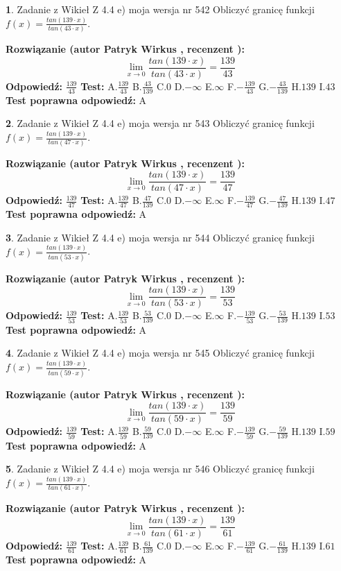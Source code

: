 \documentclass[12pt, a4paper]{article}
\theoremstyle{definition} %
\newtheorem{zad}{}
\newcommand{\zadStart}[1]{\begin{zad}#1\newline}
\newcommand{\zadStop}{\end{zad}}
\newcommand{\rozwStart}[2]{\noindent \textbf{Rozwiązanie (autor #1 , recenzent #2): }\newline}
\newcommand{\rozwStop}{\newline}
\newcommand{\odpStart}{\noindent \textbf{Odpowiedź:}\newline}
\newcommand{\odpStop}{\newline}
\newcommand{\testStart}{\noindent \textbf{Test:}\newline}
\newcommand{\testStop}{\newline}
\newcommand{\kluczStart}{\noindent \textbf{Test poprawna odpowiedź:}\newline}
\newcommand{\kluczStop}{\newline}
\begin{document}
\zadStart{Zadanie z Wikieł Z 4.4 e) moja wersja nr 542}
Obliczyć granicę funkcji $f(x)=\frac{tan(139\cdot x)}{tan(43\cdot x)}$.
\zadStop
\rozwStart{Patryk Wirkus}{}
$$\lim\limits_{x\to 0}\frac{tan(139\cdot x)}{tan(43\cdot x)}=
\frac{139}{43}$$
\rozwStop
\odpStart
$\frac{139}{43}$
\odpStop
\testStart
A.$\frac{139}{43}$
B.$\frac{43}{139}$
C.$0$
D.$-\infty$
E.$\infty$
F.$-\frac{139}{43}$
G.$-\frac{43}{139}$
H.$139$
I.$43$
\testStop
\kluczStart
A
\kluczStop



\zadStart{Zadanie z Wikieł Z 4.4 e) moja wersja nr 543}
Obliczyć granicę funkcji $f(x)=\frac{tan(139\cdot x)}{tan(47\cdot x)}$.
\zadStop
\rozwStart{Patryk Wirkus}{}
$$\lim\limits_{x\to 0}\frac{tan(139\cdot x)}{tan(47\cdot x)}=
\frac{139}{47}$$
\rozwStop
\odpStart
$\frac{139}{47}$
\odpStop
\testStart
A.$\frac{139}{47}$
B.$\frac{47}{139}$
C.$0$
D.$-\infty$
E.$\infty$
F.$-\frac{139}{47}$
G.$-\frac{47}{139}$
H.$139$
I.$47$
\testStop
\kluczStart
A
\kluczStop



\zadStart{Zadanie z Wikieł Z 4.4 e) moja wersja nr 544}
Obliczyć granicę funkcji $f(x)=\frac{tan(139\cdot x)}{tan(53\cdot x)}$.
\zadStop
\rozwStart{Patryk Wirkus}{}
$$\lim\limits_{x\to 0}\frac{tan(139\cdot x)}{tan(53\cdot x)}=
\frac{139}{53}$$
\rozwStop
\odpStart
$\frac{139}{53}$
\odpStop
\testStart
A.$\frac{139}{53}$
B.$\frac{53}{139}$
C.$0$
D.$-\infty$
E.$\infty$
F.$-\frac{139}{53}$
G.$-\frac{53}{139}$
H.$139$
I.$53$
\testStop
\kluczStart
A
\kluczStop



\zadStart{Zadanie z Wikieł Z 4.4 e) moja wersja nr 545}
Obliczyć granicę funkcji $f(x)=\frac{tan(139\cdot x)}{tan(59\cdot x)}$.
\zadStop
\rozwStart{Patryk Wirkus}{}
$$\lim\limits_{x\to 0}\frac{tan(139\cdot x)}{tan(59\cdot x)}=
\frac{139}{59}$$
\rozwStop
\odpStart
$\frac{139}{59}$
\odpStop
\testStart
A.$\frac{139}{59}$
B.$\frac{59}{139}$
C.$0$
D.$-\infty$
E.$\infty$
F.$-\frac{139}{59}$
G.$-\frac{59}{139}$
H.$139$
I.$59$
\testStop
\kluczStart
A
\kluczStop



\zadStart{Zadanie z Wikieł Z 4.4 e) moja wersja nr 546}
Obliczyć granicę funkcji $f(x)=\frac{tan(139\cdot x)}{tan(61\cdot x)}$.
\zadStop
\rozwStart{Patryk Wirkus}{}
$$\lim\limits_{x\to 0}\frac{tan(139\cdot x)}{tan(61\cdot x)}=
\frac{139}{61}$$
\rozwStop
\odpStart
$\frac{139}{61}$
\odpStop
\testStart
A.$\frac{139}{61}$
B.$\frac{61}{139}$
C.$0$
D.$-\infty$
E.$\infty$
F.$-\frac{139}{61}$
G.$-\frac{61}{139}$
H.$139$
I.$61$
\testStop
\kluczStart
A
\kluczStop
\end{document}
